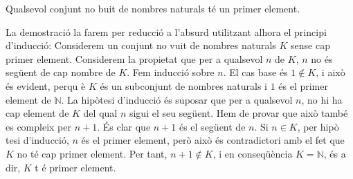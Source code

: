 \begin{thm}
Qualsevol conjunt no buit de nombres naturals t\'{e} un primer element.
\end{thm}

\begin{prova}
La demostraci\'{o} la farem per reducci\'{o} a l'absurd utilitzant alhora el
principi d'inducci\'{o}: Considerem un conjunt no vuit de nombres naturals $K
$ sense cap primer element. Considerem la propietat que per a qualsevol $n$
de $K$, $n$ no \'{e}s seg\"{u}ent de cap nombre de $K$. Fem inducci\'{o}
sobre $n$. El cas base \'{e}s $1\notin K$, i aix\`{o} \'{e}s evident, perqu%
\`{e} $K$ \'{e}s un subconjunt de nombres naturals i $1$ \'{e}s el primer
element de $\mathbb{N}$. La hip\`{o}tesi d'inducci\'{o} \'{e}s suposar que
per a qualsevol $n$, no hi ha cap element de $K$ del qual $n$ sigui el seu
seg\"{u}ent. Hem de provar que aix\`{o} tamb\'{e} es compleix per $n+1$.
\'{E}s clar que $n+1$ \'{e}s el seg\"{u}ent de $n$. Si $n\in K$, per hip\`{o}%
tesi d'inducci\'{o}, $n$ \'{e}s el primer element, per\`{o} aix\`{o} \'{e}s
contradictori amb el fet que $K$ no t\'{e} cap primer element. Per tant, $%
n+1\notin K$, i en conseq\"{u}\`{e}ncia $K=\mathbb{N}$, \'{e}s a dir, $K$ t%
\'{e} primer element.
\end{prova}
